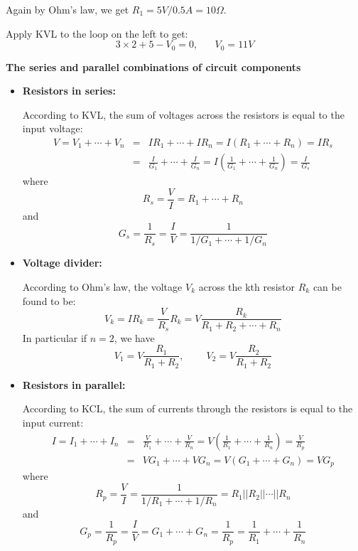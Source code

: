 \documentclass{article}
\begin{document}
Again by Ohm's law, we get $R_1=5V/0.5A=10\Omega$. 

Apply KVL to the loop on the left to get:
\begin{equation} 
  3\times 2 +5-V_0=0,\;\;\;\;\;\;V_0=11V 
\end{equation}

{\bf The series and parallel combinations of circuit components}

\begin{itemize}

\item {\bf Resistors in series:} 


  According to KVL, the sum of voltages across 
  the resistors is equal to the input voltage:
  \begin{eqnarray}	
    V=V_1+\cdots+V_n&=&IR_1+\cdots+IR_n=I(R_1+\cdots+R_n)=IR_s
    \nonumber \\
    &=&\frac{I}{G_1}+\cdots+\frac{I}{G_n}
    =I\left(\frac{1}{G_1}+\cdots+\frac{1}{G_n}\right)=\frac{I}{G_s}
  \end{eqnarray}
  where
  \begin{equation} 
    R_s=\frac{V}{I}=R_1+\cdots+R_n	
  \end{equation}
  and
  \begin{equation} 
    G_s=\frac{1}{R_s}=\frac{I}{V}=\frac{1}{1/G_1+\cdots+1/G_n}
  \end{equation}

\item {\bf Voltage divider:}

  According to Ohm's law, the voltage $V_k$ across the kth resistor $R_k$ can be 
  found to be:
  \begin{equation}
    V_k=IR_k=\frac{V}{R_s}R_k=V\frac{R_k}{R_1+R_2+\cdots+R_n} 
  \end{equation}
  In particular if $n=2$, we have
  \begin{equation} 
    V_1=V\frac{R_1}{R_1+R_2},\;\;\;\;\;\;\;\;V_2=V\frac{R_2}{R_1+R_2} 
  \end{equation}

\item {\bf Resistors in parallel:} 


  According to KCL, the sum of currents through the resistors is equal to 
  the input current:
  \begin{eqnarray}	
    I=I_1+\cdots+I_n&=&\frac{V}{R_1}+\cdots+\frac{V}{R_n}
    =V\left(\frac{1}{R_1}+\cdots+\frac{1}{R_n}\right)=\frac{V}{R_p}	
    \nonumber \\
    &=&VG_1+\cdots+VG_n=V(G_1+\cdots+G_n)=VG_p
  \end{eqnarray}
  where
  \begin{equation} 
    R_p=\frac{V}{I}=\frac{1}{1/R_1+\cdots+1/R_n}=R_1||R_2||\cdots||R_n 
  \end{equation}
  and
  \begin{equation} 
    G_p=\frac{1}{R_p}=\frac{I}{V}=G_1+\cdots+G_n=\frac{1}{R_p}
    =\frac{1}{R_1}+\cdots+\frac{1}{R_n}
  \end{equation}


\end{itemize}
\end{document}
